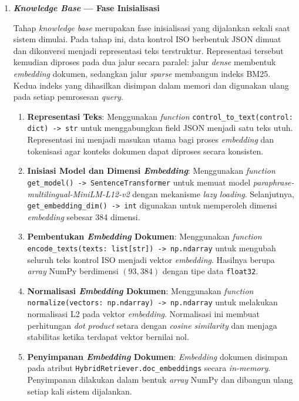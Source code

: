 \documentclass[12pt,a4paper]{article}
\begin{document}
\begin{enumerate}[leftmargin=1.1cm]
\item \textbf{\textit{Knowledge Base} --- Fase Inisialisasi}

Tahap \textit{knowledge base} merupakan fase inisialisasi yang dijalankan sekali saat sistem dimulai. Pada tahap ini, data kontrol ISO berbentuk JSON dimuat dan dikonversi menjadi representasi teks terstruktur. Representasi tersebut kemudian diproses pada dua jalur secara paralel: jalur \textit{dense} membentuk \textit{embedding} dokumen, sedangkan jalur \textit{sparse} membangun indeks BM25. Kedua indeks yang dihasilkan disimpan dalam memori dan digunakan ulang pada setiap pemrosesan \textit{query}.

\begin{enumerate}[label=\alph*., leftmargin=1.1cm]
\item \textbf{Representasi Teks}: Menggunakan \textit{function} \texttt{control\_to\_text(control: dict) -> str} untuk menggabungkan field JSON menjadi satu teks utuh. Representasi ini menjadi masukan utama bagi proses \textit{embedding} dan tokenisasi agar konteks dokumen dapat diproses secara konsisten.

\item \textbf{Inisiasi Model dan Dimensi \textit{Embedding}}: Menggunakan \textit{function} \texttt{get\_model() -> SentenceTransformer} untuk memuat model \textit{paraphrase-multilingual-MiniLM-L12-v2} dengan mekanisme \textit{lazy loading}. Selanjutnya, \texttt{get\_embedding\_dim() -> int} digunakan untuk memperoleh dimensi \textit{embedding} sebesar 384 dimensi.

\item \textbf{Pembentukan \textit{Embedding} Dokumen}: Menggunakan \textit{function} \texttt{encode\_texts(texts: list[str]) -> np.ndarray} untuk mengubah seluruh teks kontrol ISO menjadi vektor \textit{embedding}. Hasilnya berupa \textit{array} NumPy berdimensi $(93, 384)$ dengan tipe data \texttt{float32}.

\item \textbf{Normalisasi \textit{Embedding} Dokumen}: Menggunakan \textit{function} \texttt{normalize(vectors: np.ndarray) -> np.ndarray} untuk melakukan normalisasi L2 pada vektor \textit{embedding}. Normalisasi ini membuat perhitungan \textit{dot product} setara dengan \textit{cosine similarity} dan menjaga stabilitas ketika terdapat vektor bernilai nol.

\item \textbf{Penyimpanan \textit{Embedding} Dokumen}: \textit{Embedding} dokumen disimpan pada atribut \texttt{HybridRetriever.doc\_embeddings} secara \textit{in-memory}. Penyimpanan dilakukan dalam bentuk \textit{array} NumPy dan dibangun ulang setiap kali sistem dijalankan.


\end{enumerate}
\end{enumerate}
\end{document}
